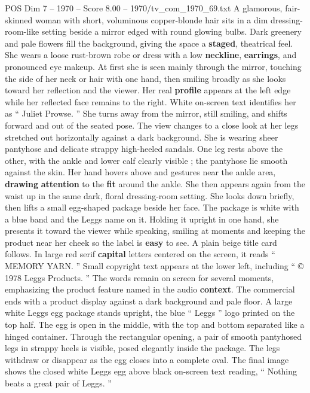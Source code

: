 \begin{textsample}{POS Dim 7 – 1970 – Score 8.00 – 1970/tv\_com\_1970\_69.txt}  \label{ex:f7_pos_034}
A glamorous, fair-skinned woman with short, voluminous copper-blonde hair sits in a dim dressing-room-like setting beside a mirror edged with round glowing bulbs.
Dark greenery and pale flowers fill the background, giving the space a \textbf{staged}, theatrical feel.
She wears a loose rust-brown robe or dress with a low \textbf{neckline}, \textbf{earrings}, and pronounced eye makeup.
At first she is seen mainly through the mirror, touching the side of her neck or hair with one hand, then smiling broadly as she looks toward her reflection and the viewer.
Her real \textbf{profile} appears at the left edge while her reflected face remains to the right.
White on-screen text identifies her as “ Juliet Prowse. ” She turns away from the mirror, still smiling, and shifts forward and out of the seated pose.
The view changes to a close look at her legs stretched out horizontally against a dark background.
She is wearing sheer pantyhose and delicate strappy high-heeled sandals.
One leg rests above the other, with the ankle and lower calf clearly visible ; the pantyhose lie smooth against the skin.
Her hand hovers above and gestures near the ankle area, \textbf{drawing} \textbf{attention} to the \textbf{fit} around the ankle.
She then appears again from the waist up in the same dark, floral dressing-room setting.
She looks down briefly, then lifts a small egg-shaped package beside her face.
The package is white with a blue band and the Leggs name on it.
Holding it upright in one hand, she presents it toward the viewer while speaking, smiling at moments and keeping the product near her cheek so the label is \textbf{easy} to see.
A plain beige title card follows.
In large red serif \textbf{capital} letters centered on the screen, it reads “ MEMORY YARN. ” Small copyright text appears at the lower left, including “ {\EmojiFont ©} 1978 Leggs Products. ” The words remain on screen for several moments, emphasizing the product feature named in the audio \textbf{context}.
The commercial ends with a product display against a dark background and pale floor.
A large white Leggs egg package stands upright, the blue “ Leggs ” logo printed on the top half.
The egg is open in the middle, with the top and bottom separated like a hinged container.
Through the rectangular opening, a pair of smooth pantyhosed legs in strappy heels is visible, posed elegantly inside the package.
The legs withdraw or disappear as the egg closes into a complete oval.
The final image shows the closed white Leggs egg above black on-screen text reading, “ Nothing beats a great pair of Leggs. ”

\end{textsample}
